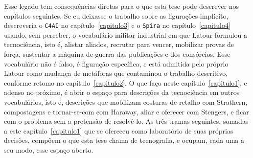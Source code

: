 Esse legado tem consequências diretas para o que esta tese pode descrever nos capítulos seguintes. Se eu deixasse o trabalho sobre as figurações implícito, descreveria o \texttt{C4AI} no capítulo~\ref{capitulo3} e o \texttt{Spira} no capítulo~\ref{capitulo4} usando, sem perceber, o vocabulário militar-industrial em que Latour formulou a tecnociência, isto é, alistar aliados, recrutar para vencer, mobilizar provas de força, sustentar a máquina de guerra das publicações e dos consórcios. Esse vocabulário não é falso, é figuração específica, e está admitida pelo próprio Latour como mudança de metáforas que contaminou o trabalho descritivo, conforme retomo no capítulo~\ref{capitulo2}. O que faço neste capítulo~\ref{capitulo1}, e adenso no próximo, é abrir o espaço para descrições da tecnociência em outros vocabulários, isto é, descrições que mobilizam costuras de retalho com Strathern, compostagens e tornar-se-com com Haraway, aliar e oferecer com Stengers, e ficar com o problema sem a pretensão de resolvê-lo. As três tramas seguintes, somadas a este capítulo~\ref{capitulo1} que se ofereceu como laboratório de suas próprias decisões, compõem o que esta tese chama de tecnografia, e ocupam, cada uma a seu modo, esse espaço aberto.